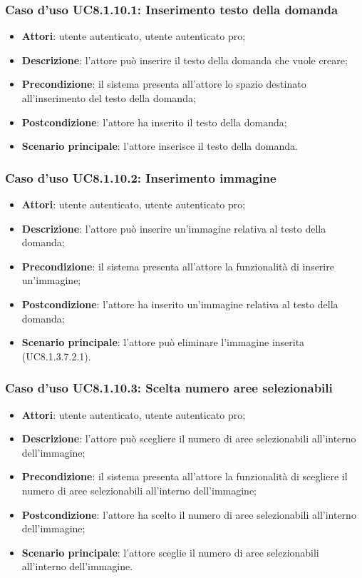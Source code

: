 \subsubsection{Caso d'uso UC8.1.10.1: Inserimento testo della domanda}
\begin{itemize}
	\item \textbf{Attori}: utente autenticato, utente autenticato pro;
	\item \textbf{Descrizione}: l'attore può inserire il testo della domanda che vuole creare;
	\item \textbf{Precondizione}: il sistema presenta all'attore lo spazio destinato all'inserimento del testo della domanda;
	\item \textbf{Postcondizione}: l'attore ha inserito il testo della domanda;
	\item \textbf{Scenario principale}: l'attore inserisce il testo della domanda. 
\end{itemize}

\subsubsection{Caso d'uso UC8.1.10.2: Inserimento immagine}
\begin{itemize}
	\item \textbf{Attori}: utente autenticato, utente autenticato pro;
	\item \textbf{Descrizione}: l'attore può inserire un'immagine relativa al testo della domanda;
	\item \textbf{Precondizione}: il sistema presenta all'attore la funzionalità di inserire un'immagine;
	\item \textbf{Postcondizione}: l'attore ha inserito un'immagine relativa al testo della domanda;
	\item \textbf{Scenario principale}: l'attore può eliminare l'immagine inserita (UC8.1.3.7.2.1).			
	\end{itemize}

\subsubsection{Caso d'uso UC8.1.10.3: Scelta numero aree selezionabili}
\begin{itemize}
	\item \textbf{Attori}: utente autenticato, utente autenticato pro;
	\item \textbf{Descrizione}: l'attore può scegliere il numero di aree selezionabili all'interno dell'immagine;
	\item \textbf{Precondizione}: il sistema presenta all'attore la funzionalità di scegliere il numero di aree selezionabili all'interno dell'immagine; 	
	\item \textbf{Postcondizione}: l'attore ha scelto il numero di aree selezionabili all'interno dell'immagine;
	\item \textbf{Scenario principale}: l'attore sceglie il numero di aree selezionabili all'interno dell'immagine. 	
\end{itemize}


